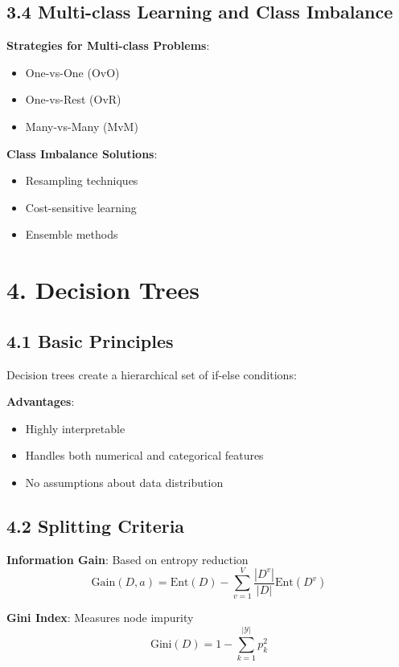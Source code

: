 \documentclass{amsart}
\theoremstyle{plain}
\theoremstyle{definition}
\theoremstyle{remark}
\begin{document}
\subsection{3.4 Multi-class Learning and Class Imbalance}

\textbf{Strategies for Multi-class Problems}:

\begin{itemize}
	\item One-vs-One (OvO)
	\item One-vs-Rest (OvR)
	\item Many-vs-Many (MvM)
\end{itemize}

\textbf{Class Imbalance Solutions}:

\begin{itemize}
	\item Resampling techniques
	\item Cost-sensitive learning
	\item Ensemble methods
\end{itemize}

\section{4. Decision Trees}

\subsection{4.1 Basic Principles}

Decision trees create a hierarchical set of if-else conditions:

\textbf{Advantages}:

\begin{itemize}
	\item Highly interpretable
	\item Handles both numerical and categorical features
	\item No assumptions about data distribution
\end{itemize}

\subsection{4.2 Splitting Criteria}

\textbf{Information Gain}: Based on entropy reduction
\[
\text{Gain}(D,a) = \text{Ent}(D) - \sum_{v=1}^V \frac{|D^v|}{|D|} \text{Ent}(D^v)
\]

\textbf{Gini Index}: Measures node impurity
\[
\text{Gini}(D) = 1 - \sum_{k=1}^{|\mathcal{Y}|} p_k^2
\]
\end{document}
